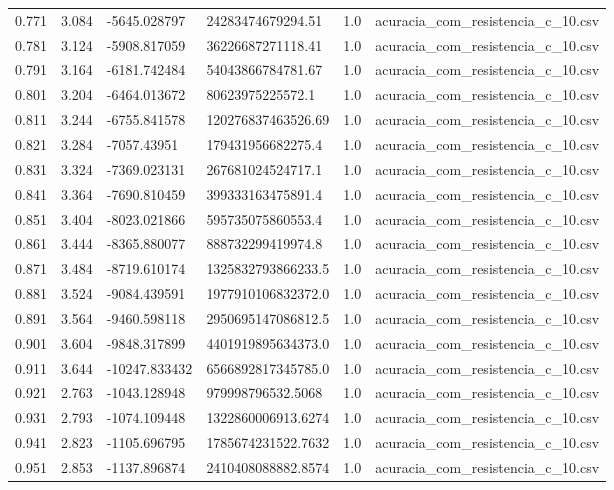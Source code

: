 \begin{table}
\begin{tabular}{llllll}
0.771 & 3.084 & -5645.028797 & 24283474679294.51 & 1.0 & acuracia\_com\_resistencia\_c\_10.csv \\
0.781 & 3.124 & -5908.817059 & 36226687271118.41 & 1.0 & acuracia\_com\_resistencia\_c\_10.csv \\
0.791 & 3.164 & -6181.742484 & 54043866784781.67 & 1.0 & acuracia\_com\_resistencia\_c\_10.csv \\
0.801 & 3.204 & -6464.013672 & 80623975225572.1 & 1.0 & acuracia\_com\_resistencia\_c\_10.csv \\
0.811 & 3.244 & -6755.841578 & 120276837463526.69 & 1.0 & acuracia\_com\_resistencia\_c\_10.csv \\
0.821 & 3.284 & -7057.43951 & 179431956682275.4 & 1.0 & acuracia\_com\_resistencia\_c\_10.csv \\
0.831 & 3.324 & -7369.023131 & 267681024524717.1 & 1.0 & acuracia\_com\_resistencia\_c\_10.csv \\
0.841 & 3.364 & -7690.810459 & 399333163475891.4 & 1.0 & acuracia\_com\_resistencia\_c\_10.csv \\
0.851 & 3.404 & -8023.021866 & 595735075860553.4 & 1.0 & acuracia\_com\_resistencia\_c\_10.csv \\
0.861 & 3.444 & -8365.880077 & 888732299419974.8 & 1.0 & acuracia\_com\_resistencia\_c\_10.csv \\
0.871 & 3.484 & -8719.610174 & 1325832793866233.5 & 1.0 & acuracia\_com\_resistencia\_c\_10.csv \\
0.881 & 3.524 & -9084.439591 & 1977910106832372.0 & 1.0 & acuracia\_com\_resistencia\_c\_10.csv \\
0.891 & 3.564 & -9460.598118 & 2950695147086812.5 & 1.0 & acuracia\_com\_resistencia\_c\_10.csv \\
0.901 & 3.604 & -9848.317899 & 4401919895634373.0 & 1.0 & acuracia\_com\_resistencia\_c\_10.csv \\
0.911 & 3.644 & -10247.833432 & 6566892817345785.0 & 1.0 & acuracia\_com\_resistencia\_c\_10.csv \\
0.921 & 2.763 & -1043.128948 & 979998796532.5068 & 1.0 & acuracia\_com\_resistencia\_c\_10.csv \\
0.931 & 2.793 & -1074.109448 & 1322860006913.6274 & 1.0 & acuracia\_com\_resistencia\_c\_10.csv \\
0.941 & 2.823 & -1105.696795 & 1785674231522.7632 & 1.0 & acuracia\_com\_resistencia\_c\_10.csv \\
0.951 & 2.853 & -1137.896874 & 2410408088882.8574 & 1.0 & acuracia\_com\_resistencia\_c\_10.csv \\

\end{tabular}
\end{table}

